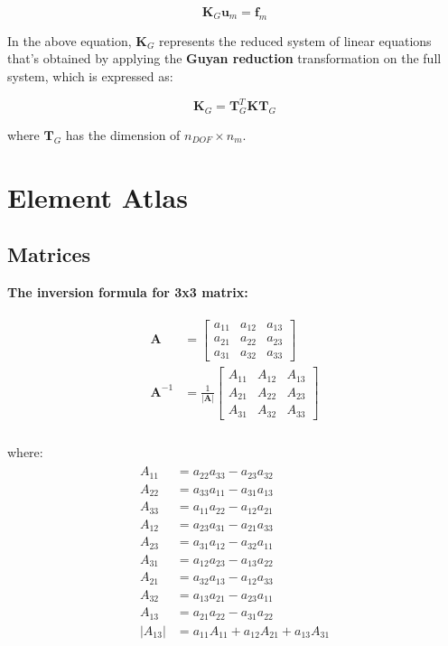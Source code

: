 \documentclass[10pt,b5paper,titlepage]{book}
\newcommand{\m}{\mathbf}
\newenvironment{eqarray}
{
    \begin{eqnarray}
        \begin{aligned}
}
{
        \end{aligned}
    \end{eqnarray}
}
\begin{document}
\begin{equation}
    \m{K}_G \m{u}_m = \m{f}_m
\end{equation}

In the above equation, $ \m{K}_G $ represents the reduced system of linear equations
that's obtained by applying the \textbf{Guyan reduction} transformation on the
full system, which is expressed as:

\begin{equation}
    \m{K}_G = \m{T}_G^T \m{K} \m{T}_G
\end{equation}

where $ \m{T}_G $ has the dimension of $ n_{DOF} \times n_m $.




\newpage
\chapter{Element Atlas}

\section{Matrices}

\textbf{The inversion formula for 3x3 matrix:}

\begin{eqarray}
    \m{A} &=
    \begin{bmatrix}
        a_{11} & a_{12} & a_{13}\\
        a_{21} & a_{22} & a_{23}\\
        a_{31} & a_{32} & a_{33}
    \end{bmatrix}\\
    \m{A}^{-1} &= \frac{1}{\vert \m{A} \vert}
    \begin{bmatrix}
        A_{11} & A_{12} & A_{13}\\
        A_{21} & A_{22} & A_{23}\\
        A_{31} & A_{32} & A_{33}
    \end{bmatrix}\\
\end{eqarray}

where:
\begin{eqarray}
    A_{11} &= a_{22} a_{33} - a_{23} a_{32}\\
    A_{22} &= a_{33} a_{11} - a_{31} a_{13}\\
    A_{33} &= a_{11} a_{22} - a_{12} a_{21}\\
    A_{12} &= a_{23} a_{31} - a_{21} a_{33}\\
    A_{23} &= a_{31} a_{12} - a_{32} a_{11}\\
    A_{31} &= a_{12} a_{23} - a_{13} a_{22}\\
    A_{21} &= a_{32} a_{13} - a_{12} a_{33}\\
    A_{32} &= a_{13} a_{21} - a_{23} a_{11}\\
    A_{13} &= a_{21} a_{22} - a_{31} a_{22}\\
    \vert A_{13} \vert &= a_{11} A_{11} + a_{12} A_{21} + a_{13} A_{31}
\end{eqarray}
\end{document}
